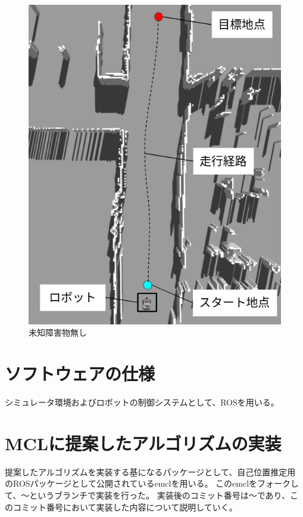 \begin{figure}[htbp]
\begin{minipage}[b]{0.5\linewidth}
    \includegraphics[keepaspectratio, scale=0.32]{figs/gazebo_known_obstacles.png}
    \caption{未知障害物無し}
    \label{fig:gazebo_known}
  \end{minipage}
\end{figure}

\section{ソフトウェアの仕様}

シミュレータ環境およびロボットの制御システムとして、ROSを用いる。

\section{MCLに提案したアルゴリズムの実装}

提案したアルゴリズムを実装する基になるパッケージとして、自己位置推定用
のROSパッケージとして公開されているemclを用いる。
このemclをフォークして、〜というブランチで実装を行った。
実装後のコミット番号は〜であり、このコミット番号において実装した内容について説明していく。

